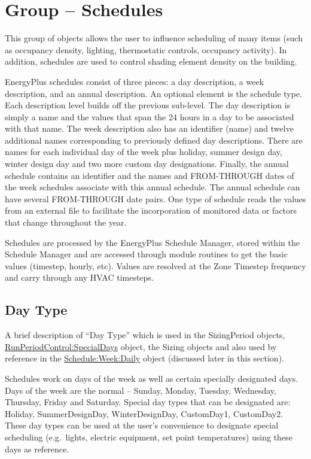 \section{Group -- Schedules}\label{group-schedules}

This group of objects allows the user to influence scheduling of many items (such as occupancy density, lighting, thermostatic controls, occupancy activity). In addition, schedules are used to control shading element density on the building.

EnergyPlus schedules consist of three pieces: a day description, a week description, and an annual description. An optional element is the schedule type. Each description level builds off the previous sub-level. The day description is simply a name and the values that span the 24 hours in a day to be associated with that name. The week description also has an identifier (name) and twelve additional names corresponding to previously defined day descriptions. There are names for each individual day of the week plus holiday, summer design day, winter design day and two more custom day designations. Finally, the annual schedule contains an identifier and the names and FROM-THROUGH dates of the week schedules associate with this annual schedule. The annual schedule can have several FROM-THROUGH date pairs. One type of schedule reads the values from an external file to facilitate the incorporation of monitored data or factors that change throughout the year.

Schedules are processed by the EnergyPlus Schedule Manager, stored within the Schedule Manager and are accessed through module routines to get the basic values (timestep, hourly, etc). Values are resolved at the Zone Timestep frequency and carry through any HVAC timesteps.

\subsection{Day Type}\label{day-type}

A brief description of ``Day Type'' which is used in the SizingPeriod objects, \hyperref[runperiodcontrolspecialdays]{RunPeriodControl:SpecialDays} object, the Sizing objects and also used by reference in the \hyperref[scheduleweekdaily]{Schedule:Week:Daily} object (discussed later in this section).

Schedules work on days of the week as well as certain specially designated days. Days of the week are the normal -- Sunday, Monday, Tuesday, Wednesday, Thursday, Friday and Saturday. Special day types that can be designated are: Holiday, SummerDesignDay, WinterDesignDay, CustomDay1, CustomDay2. These day types can be used at the user's convenience to designate special scheduling (e.g.~lights, electric equipment, set point temperatures) using these days as reference.

